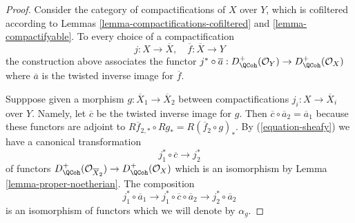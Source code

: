\begin{proof}
Consider the category of compactifications of $X$ over $Y$,
which is cofiltered according to
Lemmas \ref{lemma-compactifications-cofiltered} and \ref{lemma-compactifyable}.
To every choice of a compactification
$$
j : X \to \overline{X},\quad \overline{f} : \overline{X} \to Y
$$
the construction above associates the functor $j^* \circ \overline{a} :
D_\QCoh^+(\mathcal{O}_Y) \to D_\QCoh^+(\mathcal{O}_X)$
where $\overline{a}$ is the twisted inverse image for $\overline{f}$.

\medskip\noindent
Supppose given a morphism $g : \overline{X}_1 \to \overline{X}_2$
between compactifications $j_i : X \to \overline{X}_i$ over $Y$.
Namely, let $\overline{c}$ be the twisted inverse image for $g$.
Then $\overline{c} \circ \overline{a}_2 = \overline{a}_1$
because these functors are adjoint to
$R\overline{f}_{2, *} \circ Rg_* = R(\overline{f}_2 \circ g)_*$.
By (\ref{equation-sheafy}) we have a canonical transformation
$$
j_1^* \circ \overline{c} \longrightarrow j_2^*
$$
of functors
$D^+_\QCoh(\mathcal{O}_{\overline{X}_2}) \to D^+_\QCoh(\mathcal{O}_X)$
which is an isomorphism by Lemma \ref{lemma-proper-noetherian}.
The composition
$$
j_1^* \circ \overline{a}_1 \longrightarrow
j_1^* \circ \overline{c} \circ \overline{a}_2 \longrightarrow
j_2^* \circ \overline{a}_2
$$
is an isomorphism of functors which we will denote by $\alpha_g$.


\end{proof}
